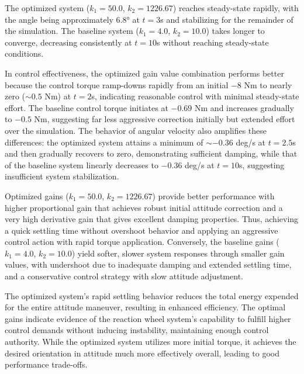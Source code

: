 \documentclass{ifacconf}
\begin{document}
The optimized system ($k_1 = 50.0$, $k_2 = 1226.67$) reaches steady-state rapidly, with the angle being approximately $6.8°$ at $t = 3$s and stabilizing for the remainder of the simulation. The baseline system ($k_1 = 4.0$, $k_2 = 10.0$) takes longer to converge, decreasing consistently at $t = 10$s without reaching steady-state conditions.

In control effectiveness, the optimized gain value combination performs better because the control torque ramp-downs rapidly from an initial $-8$ Nm to nearly zero ($\sim 0.5$ Nm) at $t = 2$s, indicating reasonable control with minimal steady-state effort. The baseline control torque initiates at $-0.69$ Nm and increases gradually to $-0.5$ Nm, suggesting far less aggressive correction initially but extended effort over the simulation. The behavior of angular velocity also amplifies these differences: the optimized system attains a minimum of $\sim -0.36$ deg/s at $t = 2.5$s and then gradually recovers to zero, demonstrating sufficient damping, while that of the baseline system linearly decreases to $-0.36$ deg/s at $t = 10$s, suggesting insufficient system stabilization.

Optimized gains ($k_1 = 50.0$, $k_2 = 1226.67$) provide better performance with higher proportional gain that achieves robust initial attitude correction and a very high derivative gain that gives excellent damping properties. Thus, achieving a quick settling time without overshoot behavior and applying an aggressive control action with rapid torque application. Conversely, the baseline gains ($k_1 = 4.0$, $k_2 = 10.0$) yield softer, slower system responses through smaller gain values, with undershoot due to inadequate damping and extended settling time, and a conservative control strategy with slow attitude adjustment.

The optimized system's rapid settling behavior reduces the total energy expended for the entire attitude maneuver, resulting in enhanced efficiency. The optimal gains indicate evidence of the reaction wheel system's capability to fulfill higher control demands without inducing instability, maintaining enough control authority. While the optimized system utilizes more initial torque, it achieves the desired orientation in attitude much more effectively overall, leading to good performance trade-offs.
\end{document}
